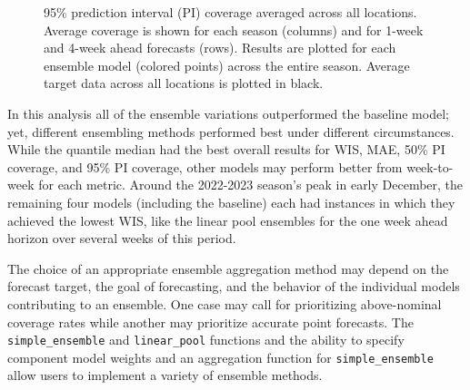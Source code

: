 \documentclass[
  article,
  shortnames,
  notitle]{jss}
\begin{document}
\begin{figure}


\caption{\label{fig-cov95-vs-forecast-date}95\% prediction interval (PI)
coverage averaged across all locations. Average coverage is shown for
each season (columns) and for 1-week and 4-week ahead forecasts (rows).
Results are plotted for each ensemble model (colored points) across the
entire season. Average target data across all locations is plotted in
black.}

\end{figure}%

In this analysis all of the ensemble variations outperformed the
baseline model; yet, different ensembling methods performed best under
different circumstances. While the quantile median had the best overall
results for WIS, MAE, 50\% PI coverage, and 95\% PI coverage, other
models may perform better from week-to-week for each metric. Around the
2022-2023 season's peak in early December, the remaining four models
(including the baseline) each had instances in which they achieved the
lowest WIS, like the linear pool ensembles for the one week ahead
horizon over several weeks of this period.

The choice of an appropriate ensemble aggregation method may depend on
the forecast target, the goal of forecasting, and the behavior of the
individual models contributing to an ensemble. One case may call for
prioritizing above-nominal coverage rates while another may prioritize
accurate point forecasts. The \texttt{simple\_ensemble} and
\texttt{linear\_pool} functions and the ability to specify component
model weights and an aggregation function for \texttt{simple\_ensemble}
allow users to implement a variety of ensemble methods.
\end{document}

